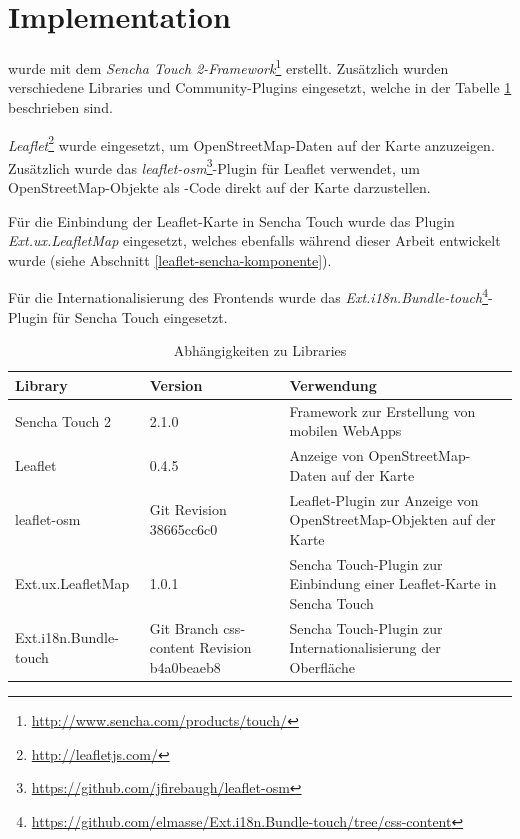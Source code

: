 \section{Implementation}

\kort wurde mit dem \emph{Sencha Touch 2-Framework}\footnote{\url{http://www.sencha.com/products/touch/}} erstellt. Zusätzlich wurden verschiedene Libraries und Community-Plugins eingesetzt, welche in der Tabelle \ref{table-kort-dependencies} beschrieben sind. 

\emph{Leaflet}\footnote{\url{http://leafletjs.com/}} wurde eingesetzt, um \gls{OpenStreetMap}-Daten auf der Karte anzuzeigen. Zusätzlich wurde das \emph{leaflet-osm}\footnote{\url{https://github.com/jfirebaugh/leaflet-osm}}-Plugin für Leaflet verwendet, um \gls{OpenStreetMap}-Objekte als -Code direkt auf der Karte darzustellen.

Für die Einbindung der Leaflet-Karte in Sencha Touch wurde das Plugin \emph{Ext.ux.LeafletMap} eingesetzt, welches ebenfalls während dieser Arbeit entwickelt wurde (siehe Abschnitt \ref{leaflet-sencha-komponente}).

Für die Internationalisierung des Frontends wurde das \emph{Ext.i18n.Bundle-touch}\footnote{\url{https://github.com/elmasse/Ext.i18n.Bundle-touch/tree/css-content}}-Plugin für Sencha Touch eingesetzt.

\begin{table}[H]
\centering
\begin{tabular}{|p{0.25\threecelltabwidth}|p{0.15\threecelltabwidth}|p{0.60\threecelltabwidth}|}
\hline 
\textbf{Library} & \textbf{Version} & \textbf{Verwendung} \\
\hline 
Sencha Touch 2 & 2.1.0 & Framework zur Erstellung von mobilen \glspl{WebApp} \\
\hline 
Leaflet & 0.4.5 & Anzeige von \gls{OpenStreetMap}-Daten auf der Karte \\
\hline 
leaflet-osm & Git Revision 38665cc6c0 & Leaflet-Plugin zur Anzeige von \gls{OpenStreetMap}-Objekten auf der Karte \\
\hline 
Ext.ux.LeafletMap & 1.0.1 & Sencha Touch-Plugin zur Einbindung einer Leaflet-Karte in Sencha Touch \\
\hline 
Ext.i18n.Bundle-touch & Git Branch css-content Revision 
b4a0beaeb8 & Sencha Touch-Plugin zur Internationalisierung der Oberfläche \\
\hline 
\end{tabular}
\caption{Abhängigkeiten zu Libraries}
\label{table-kort-dependencies}
\end{table}


